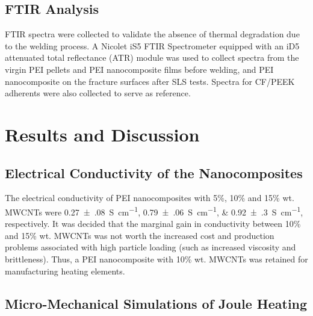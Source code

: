 \documentclass[11pt,review,times]{elsarticle}
\begin{document}
\subsection{FTIR Analysis}

FTIR spectra were collected to validate the absence of thermal degradation due to the welding process. 
A Nicolet iS5 FTIR Spectrometer equipped with an iD5 attenuated total reflectance (ATR) module was used to collect spectra from the virgin PEI pellets and PEI nanocomposite films before welding, and PEI nanocomposite on the fracture surfaces after SLS tests. 
Spectra for CF/PEEK adherents were also collected to serve as reference.  

							\section{Results and Discussion}

\subsection{Electrical Conductivity of the Nanocomposites}

The electrical conductivity of PEI nanocomposites with 5\%, 10\% and 15\% wt. MWCNTs were \SIlist[multi-part-units = single]{0.27(08);0.79(06);0.92(30)}{\siemens\per\cm}, respectively. 
It was decided that the marginal gain in conductivity between 10\% and 15\% wt. MWCNTs was not worth the increased cost and production problems associated with high particle loading (such as increased viscosity and brittleness). 
Thus, a PEI nanocomposite with 10\% wt. MWCNTs was retained for manufacturing heating elements. 

\subsection{Micro-Mechanical Simulations of Joule Heating}
\end{document}
